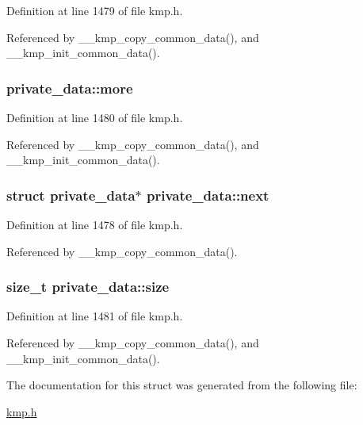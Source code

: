 Definition at line 1479 of file kmp.\-h.



Referenced by \-\_\-\-\_\-kmp\-\_\-copy\-\_\-common\-\_\-data(), and \-\_\-\-\_\-kmp\-\_\-init\-\_\-common\-\_\-data().

\hypertarget{structprivate__data_aa451b3e8ec1453affabe40b705a8c0e7}{
\subsubsection[{more}]{ private\-\_\-data\-::more}}\label{structprivate__data_aa451b3e8ec1453affabe40b705a8c0e7}


Definition at line 1480 of file kmp.\-h.



Referenced by \-\_\-\-\_\-kmp\-\_\-copy\-\_\-common\-\_\-data(), and \-\_\-\-\_\-kmp\-\_\-init\-\_\-common\-\_\-data().

\hypertarget{structprivate__data_a40405ef18e69262087a4f9430f9cefd2}{
\subsubsection[{next}]{\setlength{\rightskip}{0pt plus 5cm}struct {\bf private\-\_\-data}$\ast$ private\-\_\-data\-::next}}\label{structprivate__data_a40405ef18e69262087a4f9430f9cefd2}


Definition at line 1478 of file kmp.\-h.



Referenced by \-\_\-\-\_\-kmp\-\_\-copy\-\_\-common\-\_\-data().

\hypertarget{structprivate__data_ace2d127660a34517f0c1b53a2a2203c1}{
\subsubsection[{size}]{\setlength{\rightskip}{0pt plus 5cm}size\-\_\-t private\-\_\-data\-::size}}\label{structprivate__data_ace2d127660a34517f0c1b53a2a2203c1}


Definition at line 1481 of file kmp.\-h.



Referenced by \-\_\-\-\_\-kmp\-\_\-copy\-\_\-common\-\_\-data(), and \-\_\-\-\_\-kmp\-\_\-init\-\_\-common\-\_\-data().



The documentation for this struct was generated from the following file\-:\begin{DoxyCompactItemize}
\item 
\hyperlink{kmp_8h}{kmp.\-h}\end{DoxyCompactItemize}
